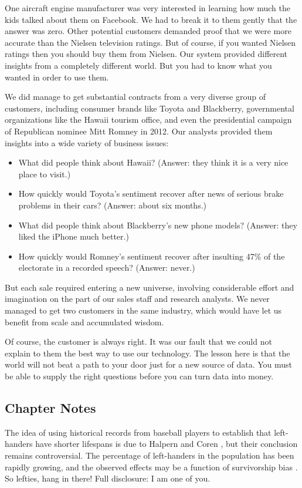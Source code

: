 \documentclass[10pt]{article}
\begin{document}
One aircraft engine manufacturer was very interested in learning how much the kids talked about them on Facebook. We had to break it to them gently that the answer was zero. Other potential customers demanded proof that we were more accurate than the Nielsen television ratings. But of course, if you wanted Nielsen ratings then you should buy them from Nielsen. Our system provided different insights from a completely different world. But you had to know what you wanted in order to use them.

We did manage to get substantial contracts from a very diverse group of customers, including consumer brands like Toyota and Blackberry, governmental organizations like the Hawaii tourism office, and even the presidential campaign of Republican nominee Mitt Romney in 2012. Our analysts provided them insights into a wide variety of business issues:

\begin{itemize}
    \item What did people think about Hawaii? (Answer: they think it is a very nice place to visit.)
    \item How quickly would Toyota's sentiment recover after news of serious brake problems in their cars? (Answer: about six months.)
    \item What did people think about Blackberry's new phone models? (Answer: they liked the iPhone much better.)
    \item How quickly would Romney's sentiment recover after insulting 47\% of the electorate in a recorded speech? (Answer: never.)
\end{itemize}

But each sale required entering a new universe, involving considerable effort and imagination on the part of our sales staff and research analysts. We never managed to get two customers in the same industry, which would have let us benefit from scale and accumulated wisdom.

Of course, the customer is always right. It was our fault that we could not explain to them the best way to use our technology. The lesson here is that the world will not beat a path to your door just for a new source of data. You must be able to supply the right questions before you can turn data into money.

\subsection{Chapter Notes}
The idea of using historical records from baseball players to establish that left-handers have shorter lifespans is due to Halpern and Coren \cite{HC88, HC91}, but their conclusion remains controversial. The percentage of left-handers in the population has been rapidly growing, and the observed effects may be a function of survivorship bias \cite{McM04}. So lefties, hang in there! Full disclosure: I am one of you.
\end{document}
